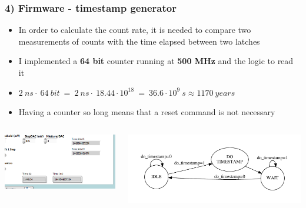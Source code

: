 \documentclass[aspectratio=169]{beamer}
\begin{document}
	\begin{frame}
		\frametitle{4) Firmware - timestamp generator}
		\begin{itemize}
			\item In order to calculate the count rate, it is needed to compare two measurements of
			counts with the time elapsed between two latches
			\item I implemented a \textbf{64 bit} counter running at \textbf{500 MHz} and the logic to read it
			\item $2 \: ns \cdot \: 64 \: bit \: =\: 2 \: ns \cdot \: 18.44\cdot10^{18} \: = \: 36.6\cdot10^{9} \: s \approx 1170 \: years$
			\item Having a counter so long means that a reset command is not necessary 
		\end{itemize}
		\begin{columns}		
			\begin{center}
				\includegraphics[width=0.8 \textwidth]{IMG2/fig15}
			\end{center}
			\begin{center}
				\includegraphics[width=1.0 \textwidth]{IMG2/TimestampFSM}
			\end{center}
		\end{columns}
	\end{frame}
\end{document}
